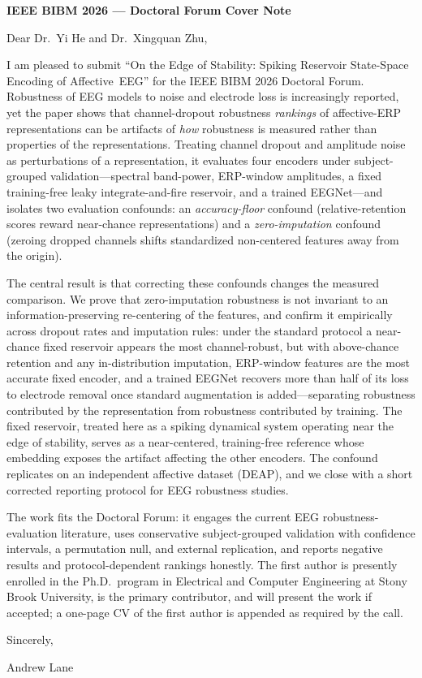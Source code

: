 \documentclass[11pt]{article}
\begin{document}
\begin{center}
{\large\textbf{IEEE BIBM 2026 --- Doctoral Forum Cover Note}}
\end{center}

\vspace{1em}

Dear Dr.\ Yi He and Dr.\ Xingquan Zhu,

I am pleased to submit ``On the Edge of Stability: Spiking Reservoir State-Space Encoding of Affective~EEG'' for the IEEE BIBM 2026 Doctoral Forum. Robustness of EEG models to noise and electrode loss is increasingly reported, yet the paper shows that channel-dropout robustness \emph{rankings} of affective-ERP representations can be artifacts of \emph{how} robustness is measured rather than properties of the representations. Treating channel dropout and amplitude noise as perturbations of a representation, it evaluates four encoders under subject-grouped validation---spectral band-power, ERP-window amplitudes, a fixed training-free leaky integrate-and-fire reservoir, and a trained EEGNet---and isolates two evaluation confounds: an \emph{accuracy-floor} confound (relative-retention scores reward near-chance representations) and a \emph{zero-imputation} confound (zeroing dropped channels shifts standardized non-centered features away from the origin).

The central result is that correcting these confounds changes the measured comparison. We prove that zero-imputation robustness is not invariant to an information-preserving re-centering of the features, and confirm it empirically across dropout rates and imputation rules: under the standard protocol a near-chance fixed reservoir appears the most channel-robust, but with above-chance retention and any in-distribution imputation, ERP-window features are the most accurate fixed encoder, and a trained EEGNet recovers more than half of its loss to electrode removal once standard augmentation is added---separating robustness contributed by the representation from robustness contributed by training. The fixed reservoir, treated here as a spiking dynamical system operating near the edge of stability, serves as a near-centered, training-free reference whose embedding exposes the artifact affecting the other encoders. The confound replicates on an independent affective dataset (DEAP), and we close with a short corrected reporting protocol for EEG robustness studies.

The work fits the Doctoral Forum: it engages the current EEG robustness-evaluation literature, uses conservative subject-grouped validation with confidence intervals, a permutation null, and external replication, and reports negative results and protocol-dependent rankings honestly. The first author is presently enrolled in the Ph.D.\ program in Electrical and Computer Engineering at Stony Brook University, is the primary contributor, and will present the work if accepted; a one-page CV of the first author is appended as required by the call.

\vspace{1em}

Sincerely,

Andrew Lane
\end{document}
